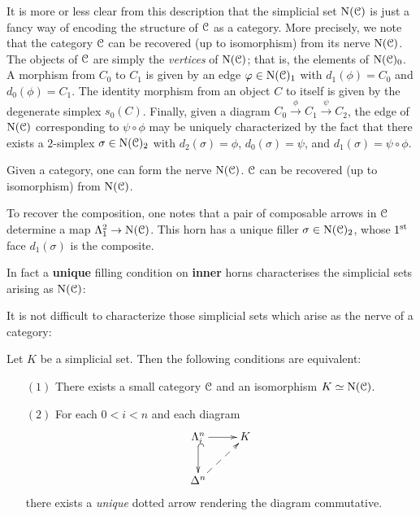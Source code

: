 It is more or less clear from this description that the simplicial
set $\operatorname{N}(\operatorname{\mathcal{C}})$ is just a fancy way of encoding the structure
of $\operatorname{\mathcal{C}}$ as a category. More precisely, we note that the
category $\operatorname{\mathcal{C}}$ can be recovered (up to isomorphism) from its
nerve $\operatorname{N}(\operatorname{\mathcal{C}})$. The objects of $\operatorname{\mathcal{C}}$ are simply the {\it
vertices} of $\operatorname{N}(\operatorname{\mathcal{C}})$; that is, the elements of $\operatorname{N}
(\operatorname{\mathcal{C}})_0$. A morphism from $C_0$ to $C_1$ is given by an edge $\varphi
\in \operatorname{N}(\operatorname{\mathcal{C}})_1$ with $d_1(\phi) = C_0$ and $d_0(\phi)=C_1$. The
identity morphism from an object $C$ to itself is given by the
degenerate simplex $s_0(C)$. Finally, given a diagram $C_0
\stackrel{\phi}{\rightarrow} C_1 \stackrel{\psi}{\rightarrow}
C_2$, the edge of $\operatorname{N}(\operatorname{\mathcal{C}})$ corresponding to $\psi \circ
\phi$ may be uniquely characterized by the fact that there exists
a $2$-simplex $\sigma \in \operatorname{N}(\operatorname{\mathcal{C}})_2$ with $d_2(\sigma)=\phi$,
$d_0(\sigma)=\psi$, and $d_1(\sigma)=\psi \circ \phi$.
\begin{shaded}
Given a category, one can form the nerve $\operatorname{N}(\operatorname{\mathcal{C}})$. $\operatorname{\mathcal{C}}$ can be recovered (up to isomorphism) from $\operatorname{N}(\operatorname{\mathcal{C}})$.

To recover the composition, one notes that a pair of composable arrows in $\operatorname{\mathcal{C}}$ determine a map $\Lambda^2_1\rightarrow\operatorname{N}(\operatorname{\mathcal{C}})$. This horn has a unique filler $\sigma\in \operatorname{N}(\operatorname{\mathcal{C}})_2$, whose $1^\textup{st}$ face $d_1(\sigma)$ is the composite.

In fact a \textbf{unique} filling condition on \textbf{inner} horns characterises the simplicial sets arising as $\operatorname{N}(\operatorname{\mathcal{C}})$:
\end{shaded}

It is not difficult to characterize those simplicial sets which arise as the nerve of a category:
\begin{proposition}\label{ruko}
Let $K$ be a simplicial set. Then the following conditions are equivalent:
\begin{itemize}
\item[$(1)$] There exists a small category $\operatorname{\mathcal{C}}$ and an isomorphism $K \simeq \operatorname{N}(\operatorname{\mathcal{C}})$.
\item[$(2)$] For each $0 < i < n$ and each diagram
$$ \xymatrix{ \Lambda^n_i \ar@{^{(}->}[d] \ar[r] & K \\
\Delta^n \ar@{-->}[ur], & \\}$$
there exists a {\em unique} dotted arrow rendering the diagram commutative.
\end{itemize}
\end{proposition}

